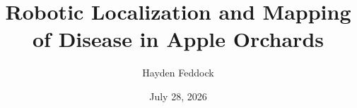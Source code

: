 
\title{\textbf{Robotic Localization and Mapping of Disease in Apple Orchards}\\ \vspace{12pt}}
\author{Hayden Feddock}
\date{July 28, 2026}

